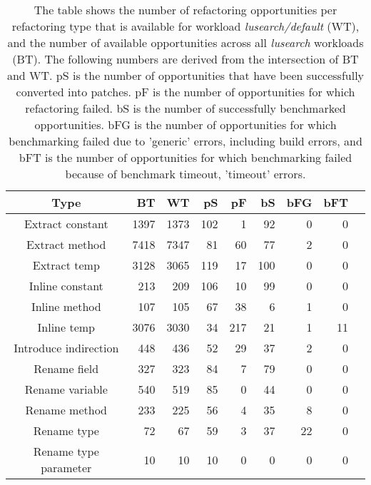 \begin{table}[!h]
\caption{The table shows the number of refactoring opportunities per refactoring type that is available for workload \textit{lusearch/default} (WT), and the number of available opportunities across all \textit{lusearch} workloads (BT). The following numbers are derived from the intersection of BT and WT. pS is the number of opportunities that have been successfully converted into patches. pF is the number of opportunities for which refactoring failed. bS is the number of successfully benchmarked opportunities. bFG is the number of opportunities for which benchmarking failed due to 'generic' errors, including build errors, and bFT is the number of opportunities for which benchmarking failed because of benchmark timeout, 'timeout' errors.}
\begin{tabular}{c|*{7}{r}r}
Type&BT&WT&pS&pF&bS&bFG&bFT\\
\hline
Extract constant&1397&1373&102&1&92&0&0\\
Extract method&7418&7347&81&60&77&2&0\\
Extract temp&3128&3065&119&17&100&0&0\\
Inline constant&213&209&106&10&99&0&0\\
Inline method&107&105&67&38&6&1&0\\
Inline temp&3076&3030&34&217&21&1&11\\
Introduce indirection&448&436&52&29&37&2&0\\
Rename field&327&323&84&7&79&0&0\\
Rename variable&540&519&85&0&44&0&0\\
Rename method&233&225&56&4&35&8&0\\
Rename type&72&67&59&3&37&22&0\\
Rename type parameter&10&10&10&0&0&0&0\\
\end{tabular}
\end{table}
